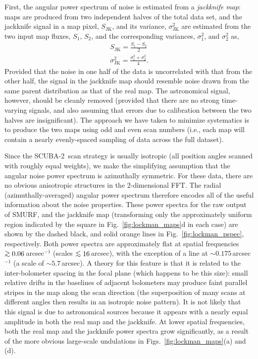 \documentclass[useAMS,usenatbib,nofootinbib]{mn2e}
\newcommand{\scuba}{SCUBA-2}
\def\lsim{\mathrel{\lower2.5pt\vbox{\lineskip=0pt\baselineskip=0pt
          \hbox{$<$}\hbox{$\sim$}}}}
\def\gsim{\mathrel{\lower2.5pt\vbox{\lineskip=0pt\baselineskip=0pt
          \hbox{$>$}\hbox{$\sim$}}}}
\begin{document}
First, the angular power spectrum of noise is estimated from a
\emph{jackknife map}: maps are produced from two independent halves of
the total data set, and the jackknife signal in a map pixel,
$S_\mathrm{JK}$, and its variance, $\sigma^2_\mathrm{JK}$ are
estimated from the two input map fluxes, $S_1$, $S_2$, and the
corresponding variances, $\sigma^2_1$, and $\sigma^2_2$ as,
%
\begin{eqnarray}
S_\mathrm{JK} = \frac{S_1 - S_2}{2} \\
\sigma^2_\mathrm{JK} = \frac{\sigma^2_1 + \sigma^2_2}{4}.
\end{eqnarray}
%
Provided that the noise in one half of the data is uncorrelated with
that from the other half, the signal in the jackknife map should
resemble noise drawn from the same parent distribution as that of the
real map. The astronomical signal, however, should be cleanly removed
(provided that there are no strong time-varying signals, and also
assuming that errors due to calibration between the two halves are
insignificant). The approach we have taken to minimize systematics is
to produce the two maps using odd and even scan numbers (i.e., each
map will contain a nearly evenly-spaced sampling of data across the
full dataset).

Since the \scuba\ scan strategy is usually isotropic (all position
angles scanned with roughly equal weights), we make the simplifying
assumption that the angular noise power spectrum is azimuthally
symmetric. For these data, there are no obvious anisotropic structures
in the 2-dimensional FFT. The radial (azimuthally-averaged) angular
power spectrum therefore encodes all of the useful information about
the noise properties. These power spectra for the raw output of SMURF,
and the jackknife map (transforming only the approximately uniform
region indicated by the square in Fig.~\ref{fig:lockman_maps}d in each
case) are shown by the dashed black, and solid orange lines in
Fig.~\ref{fig:lockman_pspec}, respectively. Both power spectra are
approximately flat at spatial frequencies $\gsim 0.06$\,arcsec$^{-1}$
(scales $\lsim16$\,arcsec), with the exception of a line at
$\sim0.175$\,arcsec$^{-1}$ (a scale of $\sim5.7$\,arcsec). A theory
for this feature is that it is related to the inter-bolometer spacing
in the focal plane (which happens to be this size): small relative
drifts in the baselines of adjacent bolometers may produce faint
parallel stripes in the map along the scan direction (the
superposition of many scans at different angles then results in an
isotropic noise pattern). It is not likely that this signal is due to
astronomical sources because it appears with a nearly equal amplitude
in both the real map and the jackknife.  At lower spatial frequencies,
both the real map and the jackknife power spectra grow significantly,
as a result of the more obvious large-scale undulations in
Figs.~\ref{fig:lockman_maps}(a) and (d).
\end{document}
